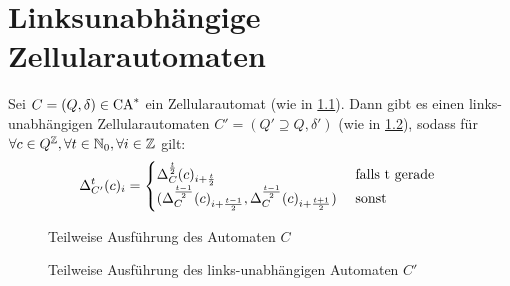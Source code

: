 \chapter{Linksunabhängige Zellularautomaten}
\label{chap:LinksunabhAuto}



\begin{satz}
    \label{zellautoZuLinksunabhaengig}
    Sei $C = (Q, \delta) \in \textrm{CA}^*$ ein Zellularautomat (wie in \cref{fig:NormalZuRechtsUnabh}).
    Dann gibt es einen links-unabhängigen Zellularautomaten $C' = (Q' \supseteq Q, \delta')$ (wie in \cref{fig:NormalZuRechtsUnabh2}),
    sodass
    für $\forall c \in Q^{\mathbb{Z}}, \forall t \in \mathbb{N}_0, \forall i \in \mathbb{Z}$ gilt:
    \[
            \Delta_{C'}^{t}(c)_i =
            \begin{cases}
                \Delta_C^{\frac{t}{2}}(c)_{i+\frac{t}{2}} & \text{ falls } $t$ \text{ gerade } \\
                (\Delta_C^{\frac{t - 1}{2}}(c)_{i+\frac{t - 1}{2}}, \Delta_C^{\frac{t-1}{2}}(c)_{i+\frac{t+1}{2}})  & \text{ sonst}
            \end{cases}
    \]
        

    \begin{figure}[h!]
        \centering
        
        \caption{Teilweise Ausführung des Automaten $C$}
        \label{fig:NormalZuRechtsUnabh}
    \end{figure}
   \begin{figure}[h!]
        \centering
        
        \caption{Teilweise Ausführung des links-unabhängigen Automaten $C'$}
        \label{fig:NormalZuRechtsUnabh2}
    \end{figure}

\end{satz}
